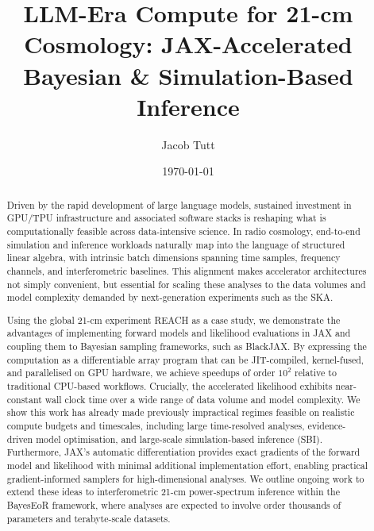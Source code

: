 \documentclass[11pt]{article}
\title{LLM-Era Compute for 21-cm Cosmology: JAX-Accelerated Bayesian \& Simulation-Based Inference}
\author{Jacob Tutt}
\date{\today}
\begin{document}
\maketitle

\begin{abstract}
Driven by the rapid development of large language models, sustained investment in GPU/TPU infrastructure and associated software stacks is reshaping what is computationally feasible across data-intensive science. In radio cosmology, end-to-end simulation and inference workloads naturally map into the language of structured linear algebra, with intrinsic batch dimensions spanning time samples, frequency channels, and interferometric baselines. This alignment makes accelerator architectures not simply convenient, but essential for scaling these analyses to the data volumes and model complexity demanded by next-generation experiments such as the SKA.

Using the global 21-cm experiment REACH as a case study, we demonstrate the advantages of implementing forward models and likelihood evaluations in JAX and coupling them to Bayesian sampling frameworks, such as BlackJAX. By expressing the computation as a differentiable array program that can be JIT-compiled, kernel-fused, and parallelised on GPU hardware, we achieve speedups of order $10^2$ relative to traditional CPU-based workflows. Crucially, the accelerated likelihood exhibits near-constant wall clock time over a wide range of data volume and model complexity. We show this work has already made previously impractical regimes feasible on realistic compute budgets and timescales, including large time-resolved analyses, evidence-driven model optimisation, and large-scale simulation-based inference (SBI). Furthermore, JAX's automatic differentiation provides exact gradients of the forward model and likelihood with minimal additional implementation effort, enabling practical gradient-informed samplers for high-dimensional analyses. We outline ongoing work to extend these ideas to interferometric 21-cm power-spectrum inference within the BayesEoR framework, where analyses are expected to involve order thousands of parameters and terabyte-scale datasets.
\end{abstract}
\end{document}
